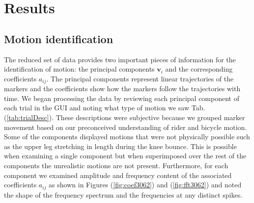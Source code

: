 \section{Results}
\label{sec:results}
\subsection{Motion identification}
\label{sec:motionId}
The reduced set of data provides two important pieces of information for the
identification of motion: the principal components $\mathbf{v}_i$ and the
corresponding coefficients $a_{ij}$. The principal components represent linear
trajectories of the markers and the coefficients show how the markers follow
the trajectories with time. We began processing the data by reviewing each
principal component of each trial in the GUI and noting what type of
motion we saw Tab. (\ref{tab:trialDesc}). These descriptions were subjective
because we grouped marker movement based on our preconceived understanding of
rider and bicycle motion. Some of the components displayed motions that were not
physically possible such as the upper leg stretching in length during the knee
bounce. This is possible when examining a single component but when
superimposed over the rest of the components the unrealistic motions are not
present. Furthermore, for each component we examined amplitude and frequency
content of the associated coefficients $a_{ij}$ as shown in Figures
(\ref{fig:coef3062}) and (\ref{fig:fft3062}) and noted the shape of the
frequency spectrum and the
frequencies at any distinct spikes.

